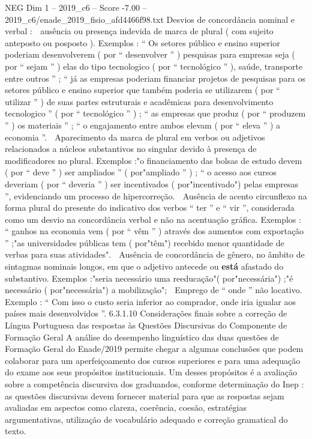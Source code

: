 \begin{textsample}{NEG Dim 1 – 2019\_c6 – Score -7.00 – 2019\_c6/enade\_2019\_fisio\_afd4466f98.txt}
Desvios de concordância nominal e verbal :  ausência ou presença indevida de marca de plural ( com sujeito anteposto ou posposto ).
Exemplos : “ Os setores público e ensino superior poderiam desenvolverem ( por “ desenvolver ” ) pesquisas para empresas seja ( por “ sejam ” ) elas do tipo tecnologico ( por “ tecnológico ” ), saúde, transporte entre outros ” ; “ já as empresas poderiam financiar projetos de pesquisas para os setores público e ensino superior que também poderia se utilizarem ( por “ utilizar ” ) de suas partes estruturais e acadêmicas para desenvolvimento tecnologico ” ( por “ tecnológico ” ) ; “ as empresas que produz ( por “ produzem ” ) os materiais ” ; “ o engajamento entre ambos elevam ( por “ eleva ” ) a economia ”.  Aparecimento da marca de plural em verbos ou adjetivos relacionados a núcleos substantivos no singular devido à presença de modificadores no plural.
Exemplos :"o financiamento das bolsas de estudo devem ( por “ deve ” ) ser ampliados ” ( por"ampliado ” ) ; “ o acesso aos cursos deveriam ( por “ deveria ” ) ser incentivados ( por"incentivado") pelas empresas ”, evidenciando um processo de hipercorreção.  Ausência de acento circunflexo na forma plural do presente do indicativo dos verbos “ ter ” e “ vir ”, considerada como um desvio na concordância verbal e não na acentuação gráfica.
Exemplos : “ ganhos na economia vem ( por “ vêm ” ) através dos aumentos com exportação ” ;"as universidades públicas tem ( por"têm") recebido menor quantidade de verbas para suas atividades".  Ausência de concordância de gênero, no âmbito de sintagmas nominais longos, em que o adjetivo antecede ou \textbf{está} afastado do substantivo.
Exemplos :"seria necessário uma reeducação"( por"necessária") ;"é necessário ( por"necessária") a mobilização";  Emprego de “ onde ” não locativo.
Exemplo : “ Com isso o custo seria inferior ao comprador, onde iria igualar aos países mais desenvolvidos ”. 6.3.1.10 Considerações finais sobre a correção de Língua Portuguesa das respostas às Questões Discursivas do Componente de Formação Geral A análise do desempenho linguístico das duas questões de Formação Geral do Enade/2019 permite chegar a algumas conclusões que podem colaborar para um aperfeiçoamento dos cursos superiores e para uma adequação do exame aos seus propósitos institucionais.
Um desses propósitos é a avaliação sobre a competência discursiva dos graduandos, conforme determinação do Inep : as questões discursivas devem fornecer material para que as respostas sejam avaliadas em aspectos como clareza, coerência, coesão, estratégias argumentativas, utilização de vocabulário adequado e correção gramatical do texto.

\end{textsample}
